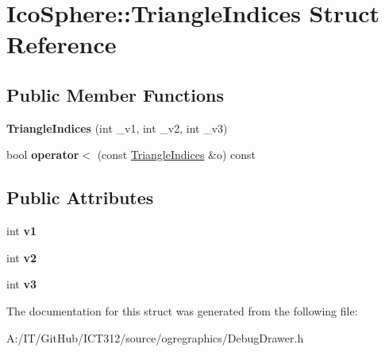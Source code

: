 \hypertarget{struct_ico_sphere_1_1_triangle_indices}{\section{Ico\-Sphere\-:\-:Triangle\-Indices Struct Reference}
\label{struct_ico_sphere_1_1_triangle_indices}
}
\subsection*{Public Member Functions}
\begin{DoxyCompactItemize}
\item 
\hypertarget{struct_ico_sphere_1_1_triangle_indices_ab081d7fcd29a87968cb6f4eaf0a191fd}{{\bfseries Triangle\-Indices} (int \-\_\-v1, int \-\_\-v2, int \-\_\-v3)}\label{struct_ico_sphere_1_1_triangle_indices_ab081d7fcd29a87968cb6f4eaf0a191fd}

\item 
\hypertarget{struct_ico_sphere_1_1_triangle_indices_a0433cdbccce9d48b0f55e2d3256666cf}{bool {\bfseries operator$<$} (const \hyperlink{struct_ico_sphere_1_1_triangle_indices}{Triangle\-Indices} \&o) const }\label{struct_ico_sphere_1_1_triangle_indices_a0433cdbccce9d48b0f55e2d3256666cf}

\end{DoxyCompactItemize}
\subsection*{Public Attributes}
\begin{DoxyCompactItemize}
\item 
\hypertarget{struct_ico_sphere_1_1_triangle_indices_a6b867bfc7660d478b034db0f7c9b5eaa}{int {\bfseries v1}}\label{struct_ico_sphere_1_1_triangle_indices_a6b867bfc7660d478b034db0f7c9b5eaa}

\item 
\hypertarget{struct_ico_sphere_1_1_triangle_indices_ac9c7858fe1c8ffc4f99b417954d53bef}{int {\bfseries v2}}\label{struct_ico_sphere_1_1_triangle_indices_ac9c7858fe1c8ffc4f99b417954d53bef}

\item 
\hypertarget{struct_ico_sphere_1_1_triangle_indices_ac70983c073b90f99a48ccab911f35638}{int {\bfseries v3}}\label{struct_ico_sphere_1_1_triangle_indices_ac70983c073b90f99a48ccab911f35638}

\end{DoxyCompactItemize}


The documentation for this struct was generated from the following file\-:\begin{DoxyCompactItemize}
\item 
A\-:/\-I\-T/\-Git\-Hub/\-I\-C\-T312/source/ogregraphics/Debug\-Drawer.\-h\end{DoxyCompactItemize}
